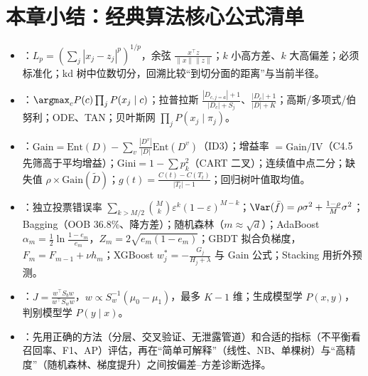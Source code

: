 \section{本章小结：经典算法核心公式清单}
{\small
\begin{itemize}
\item {}：$L_p=(\sum_j|x_j-z_j|^p)^{1/p}$，余弦 $\frac{x^\top z}{\|x\|\|z\|}$；$k$ 小高方差、$k$ 大高偏差；必须标准化；kd 树中位数切分，回溯比较“到切分面的距离”与当前半径。
\item {}：$\argmax_cP(c)\prod_jP(x_j\mid c)$；拉普拉斯 $\frac{|D_{c,j=a}|+1}{|D_c|+S_j}$、$\frac{|D_c|+1}{|D|+K}$；高斯/多项式/伯努利；ODE、TAN；贝叶斯网 $\prod_jP(x_j\mid\pi_j)$。
\item {}：$\mathrm{Gain}=\mathrm{Ent}(D)-\sum_v\frac{|D^v|}{|D|}\mathrm{Ent}(D^v)$（ID3）；增益率 $=\mathrm{Gain}/\mathrm{IV}$（C4.5 先筛高于平均增益）；$\mathrm{Gini}=1-\sum p_k^2$（CART 二叉）；连续值中点二分；缺失值 $\rho\times\mathrm{Gain}(\tilde D)$；$g(t)=\frac{C(t)-C(T_t)}{|T_t|-1}$；回归树叶值取均值。
\item {}：独立投票错误率 $\sum_{k>M/2}\binom Mk\varepsilon^k(1-\varepsilon)^{M-k}$；$\Var(\bar f)=\rho\sigma^2+\frac{1-\rho}M\sigma^2$；Bagging（OOB 36.8\%、降方差）；随机森林（$m\approx\sqrt d$）；AdaBoost $\alpha_m=\frac12\ln\frac{1-e_m}{e_m}$，$Z_m=2\sqrt{e_m(1-e_m)}$；GBDT 拟合负梯度，$F_m=F_{m-1}+\nu h_m$；XGBoost $w_j^*=-\frac{G_j}{H_j+\lambda}$ 与 Gain 公式；Stacking 用折外预测。
\item {}：$J=\frac{w^\top S_bw}{w^\top S_ww}$，$w\propto S_w^{-1}(\mu_0-\mu_1)$，最多 $K-1$ 维；生成模型学 $P(x,y)$，判别模型学 $P(y\mid x)$。
\item {}：先用正确的方法（分层、交叉验证、无泄露管道）和合适的指标（不平衡看召回率、F1、AP）评估，再在“简单可解释”（线性、NB、单棵树）与“高精度”（随机森林、梯度提升）之间按偏差–方差诊断选择。
\end{itemize}}

